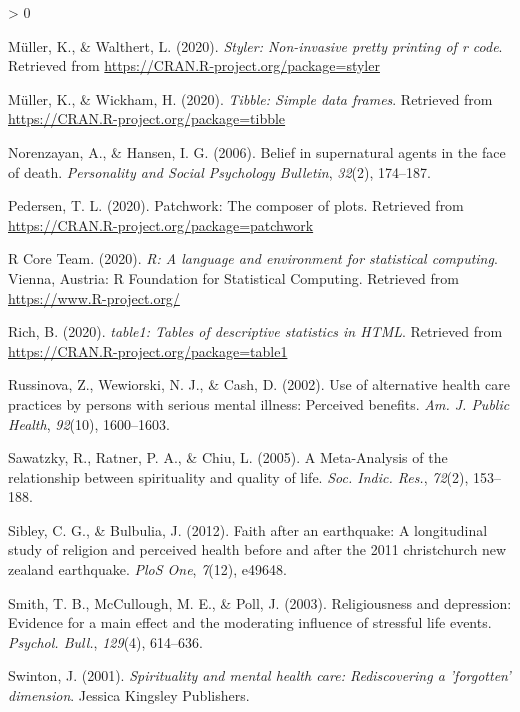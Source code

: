 \documentclass[
  english,
  man,floatsintext]{apa6}
\newlength{\cslhangindent}
\newenvironment{CSLReferences}[2] %
 {%
  \setlength{\parindent}{0pt}
  \ifodd #1 \everypar{\setlength{\hangindent}{\cslhangindent}}\ignorespaces\fi
  \ifnum #2 > 0
  \setlength{\parskip}{#2\baselineskip}
  \fi
 }%
 {}
\begin{document}
\begin{CSLReferences}{1}{0}
\leavevmode\hypertarget{ref-R-styler}{}%
Müller, K., \& Walthert, L. (2020). \emph{Styler: Non-invasive pretty printing of r code}. Retrieved from \url{https://CRAN.R-project.org/package=styler}

\leavevmode\hypertarget{ref-R-tibble}{}%
Müller, K., \& Wickham, H. (2020). \emph{Tibble: Simple data frames}. Retrieved from \url{https://CRAN.R-project.org/package=tibble}

\leavevmode\hypertarget{ref-norenzayan2006belief}{}%
Norenzayan, A., \& Hansen, I. G. (2006). Belief in supernatural agents in the face of death. \emph{Personality and Social Psychology Bulletin}, \emph{32}(2), 174--187.

\leavevmode\hypertarget{ref-R-patchwork}{}%
Pedersen, T. L. (2020). Patchwork: The composer of plots. Retrieved from \url{https://CRAN.R-project.org/package=patchwork}

\leavevmode\hypertarget{ref-R-base}{}%
R Core Team. (2020). \emph{R: A language and environment for statistical computing}. Vienna, Austria: R Foundation for Statistical Computing. Retrieved from \url{https://www.R-project.org/}

\leavevmode\hypertarget{ref-R-table1}{}%
Rich, B. (2020). \emph{table1: Tables of descriptive statistics in HTML}. Retrieved from \url{https://CRAN.R-project.org/package=table1}

\leavevmode\hypertarget{ref-Russinova2002-rq}{}%
Russinova, Z., Wewiorski, N. J., \& Cash, D. (2002). Use of alternative health care practices by persons with serious mental illness: Perceived benefits. \emph{Am. J. Public Health}, \emph{92}(10), 1600--1603.

\leavevmode\hypertarget{ref-Sawatzky2005-rw}{}%
Sawatzky, R., Ratner, P. A., \& Chiu, L. (2005). A {Meta-Analysis} of the relationship between spirituality and quality of life. \emph{Soc. Indic. Res.}, \emph{72}(2), 153--188.

\leavevmode\hypertarget{ref-sibley2012faith}{}%
Sibley, C. G., \& Bulbulia, J. (2012). Faith after an earthquake: A longitudinal study of religion and perceived health before and after the 2011 christchurch new zealand earthquake. \emph{PloS One}, \emph{7}(12), e49648.

\leavevmode\hypertarget{ref-Smith2003-re}{}%
Smith, T. B., McCullough, M. E., \& Poll, J. (2003). Religiousness and depression: Evidence for a main effect and the moderating influence of stressful life events. \emph{Psychol. Bull.}, \emph{129}(4), 614--636.

\leavevmode\hypertarget{ref-Swinton2001-vr}{}%
Swinton, J. (2001). \emph{Spirituality and mental health care: Rediscovering a 'forgotten' dimension}. Jessica Kingsley Publishers.


\end{CSLReferences}
\end{document}
